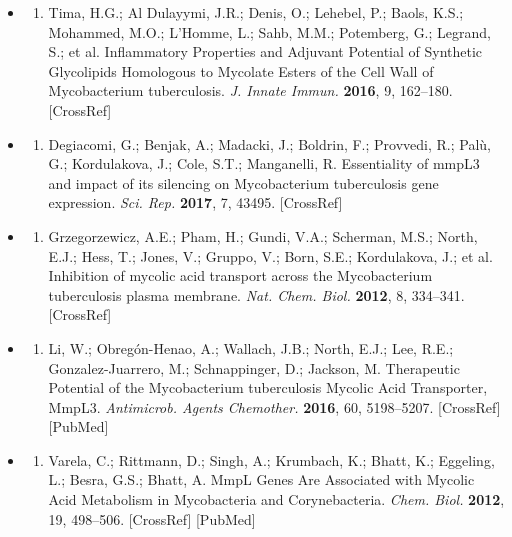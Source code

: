 \documentclass{article}
\begin{document}
\begin{itemize}
\begin{enumerate}
\end{enumerate}

\item \begin{enumerate}
\item 
Tima, H.G.; Al Dulayymi, J.R.; Denis, O.; Lehebel, P.; Baols, K.S.; Mohammed, M.O.; L'Homme, L.; Sahb, M.M.; Potemberg, G.; Legrand, S.; et al. Inflammatory Properties and Adjuvant Potential of Synthetic Glycolipids Homologous to Mycolate Esters of the Cell Wall of Mycobacterium tuberculosis. \textit{J. Innate Immun.} \textbf{2016}, 9, 162–180. [CrossRef]

\end{enumerate}

\item \begin{enumerate}
\item 
Degiacomi, G.; Benjak, A.; Madacki, J.; Boldrin, F.; Provvedi, R.; Palù, G.; Kordulakova, J.; Cole, S.T.; Manganelli, R. Essentiality of mmpL3 and impact of its silencing on Mycobacterium tuberculosis gene expression. \textit{Sci. Rep.} \textbf{2017}, 7, 43495. [CrossRef]

\end{enumerate}

\item \begin{enumerate}
\item 
Grzegorzewicz, A.E.; Pham, H.; Gundi, V.A.; Scherman, M.S.; North, E.J.; Hess, T.; Jones, V.; Gruppo, V.; Born, S.E.; Kordulakova, J.; et al. Inhibition of mycolic acid transport across the Mycobacterium tuberculosis plasma membrane. \textit{Nat. Chem. Biol.} \textbf{2012}, 8, 334–341. [CrossRef]

\end{enumerate}

\item \begin{enumerate}
\item 
Li, W.; Obregón-Henao, A.; Wallach, J.B.; North, E.J.; Lee, R.E.; Gonzalez-Juarrero, M.; Schnappinger, D.; Jackson, M. Therapeutic Potential of the Mycobacterium tuberculosis Mycolic Acid Transporter, MmpL3. \textit{Antimicrob. Agents Chemother.} \textbf{2016}, 60, 5198–5207. [CrossRef] [PubMed]

\end{enumerate}

\item \begin{enumerate}
\item 
Varela, C.; Rittmann, D.; Singh, A.; Krumbach, K.; Bhatt, K.; Eggeling, L.; Besra, G.S.; Bhatt, A. MmpL Genes Are Associated with Mycolic Acid Metabolism in Mycobacteria and Corynebacteria. \textit{Chem. Biol.} \textbf{2012}, 19, 498–506. [CrossRef] [PubMed]


\end{enumerate}
\end{itemize}
\end{document}
